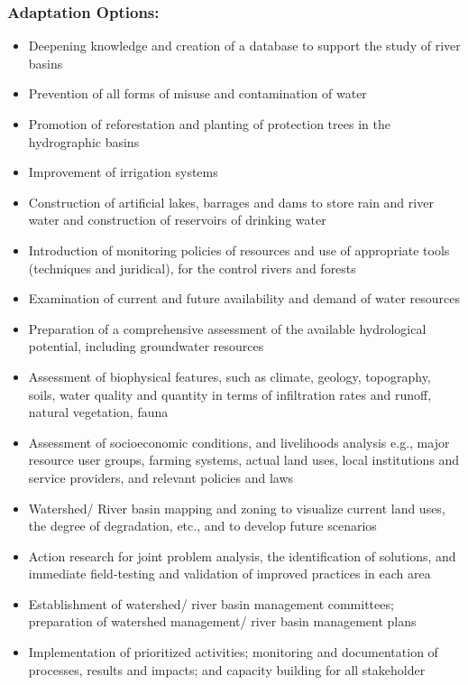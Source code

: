 \documentclass[
]{book}
\providecommand{\tightlist}{%
  \setlength{\itemsep}{0pt}\setlength{\parskip}{0pt}}
\begin{document}
\hypertarget{adaptation-options-13}{%
\subsubsection{Adaptation Options:}\label{adaptation-options-13}}

\begin{itemize}
\tightlist
\item
  Deepening knowledge and creation of a database to support the study of river basins
\item
  Prevention of all forms of misuse and contamination of water
\item
  Promotion of reforestation and planting of protection trees in the hydrographic basins
\item
  Improvement of irrigation systems
\item
  Construction of artificial lakes, barrages and dams to store rain and river water and construction of reservoirs of drinking water
\item
  Introduction of monitoring policies of resources and use of appropriate tools (techniques and juridical), for the control rivers and forests
\item
  Examination of current and future availability and demand of water resources
\item
  Preparation of a comprehensive assessment of the available hydrological potential, including groundwater resources
\item
  Assessment of biophysical features, such as climate, geology, topography, soils, water quality and quantity in terms of infiltration rates and runoff, natural vegetation, fauna
\item
  Assessment of socioeconomic conditions, and livelihoods analysis e.g., major resource user groups, farming systems, actual land uses, local institutions and service providers, and relevant policies and laws
\item
  Watershed/ River basin mapping and zoning to visualize current land uses, the degree of degradation, etc., and to develop future scenarios
\item
  Action research for joint problem analysis, the identification of solutions, and immediate field-testing and validation of improved practices in each area
\item
  Establishment of watershed/ river basin management committees; preparation of watershed management/ river basin management plans
\item
  Implementation of prioritized activities; monitoring and documentation of processes, results and impacts; and capacity building for all stakeholder
\end{itemize}
\end{document}
